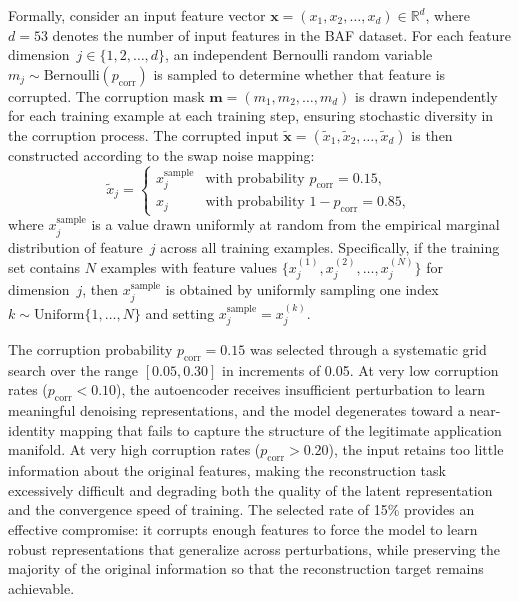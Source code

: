 Formally, consider an input feature vector $\mathbf{x} = (x_1, x_2, \ldots, x_d) \in \mathbb{R}^d$, where $d = 53$ denotes the number of input features in the BAF dataset. For each feature dimension~$j \in \{1, 2, \ldots, d\}$, an independent Bernoulli random variable $m_j \sim \text{Bernoulli}(p_{\text{corr}})$ is sampled to determine whether that feature is corrupted. The corruption mask $\mathbf{m} = (m_1, m_2, \ldots, m_d)$ is drawn independently for each training example at each training step, ensuring stochastic diversity in the corruption process. The corrupted input $\tilde{\mathbf{x}} = (\tilde{x}_1, \tilde{x}_2, \ldots, \tilde{x}_d)$ is then constructed according to the swap noise mapping:
\begin{equation}
\tilde{x}_j = \begin{cases} x_j^{\text{sample}} & \text{with probability } p_{\text{corr}} = 0.15, \\ x_j & \text{with probability } 1 - p_{\text{corr}} = 0.85, \end{cases}
\label{eq:swap-noise}
\end{equation}
where $x_j^{\text{sample}}$ is a value drawn uniformly at random from the empirical marginal distribution of feature~$j$ across all training examples. Specifically, if the training set contains $N$ examples with feature values $\{x_j^{(1)}, x_j^{(2)}, \ldots, x_j^{(N)}\}$ for dimension~$j$, then $x_j^{\text{sample}}$ is obtained by uniformly sampling one index $k \sim \text{Uniform}\{1, \ldots, N\}$ and setting $x_j^{\text{sample}} = x_j^{(k)}$.

The corruption probability $p_{\text{corr}} = 0.15$ was selected through a systematic grid search over the range $[0.05, 0.30]$ in increments of 0.05. At very low corruption rates ($p_{\text{corr}} < 0.10$), the autoencoder receives insufficient perturbation to learn meaningful denoising representations, and the model degenerates toward a near-identity mapping that fails to capture the structure of the legitimate application manifold. At very high corruption rates ($p_{\text{corr}} > 0.20$), the input retains too little information about the original features, making the reconstruction task excessively difficult and degrading both the quality of the latent representation and the convergence speed of training. The selected rate of 15\% provides an effective compromise: it corrupts enough features to force the model to learn robust representations that generalize across perturbations, while preserving the majority of the original information so that the reconstruction target remains achievable.

